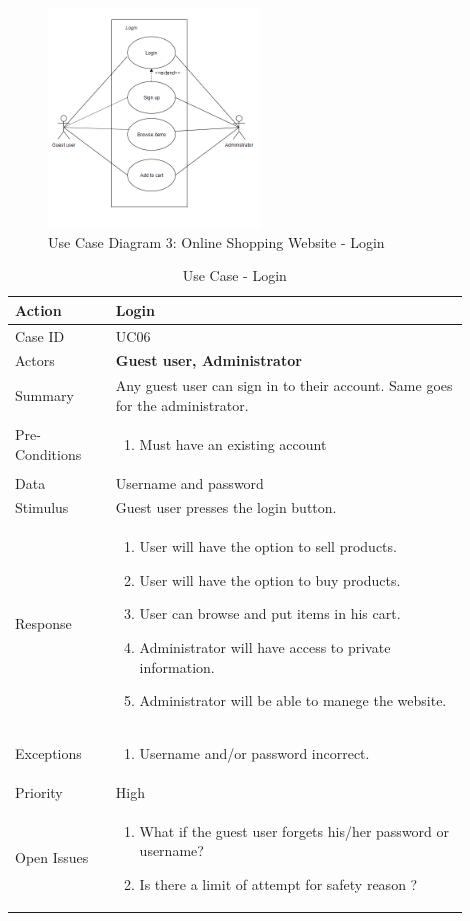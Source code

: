 \documentclass[11pt]{article}
\newcounter{use case ID}
\newcommand\tabularhead[1]{
    \begin{table}[ht]
        \addtocounter{use case ID}{1}
        \caption{Use Case \arabic{use case ID} - #1}
        \vspace{0.2cm}
        \begin{tabular}{|p{0.2\linewidth}|p{0.70\linewidth}|}
            \hline
            \textbf{Action} & \textbf{#1} \\
            \hline}
\newcommand\addrow[2]{#1 & #2\\ \hline}
\newcommand\addmulrow[2]{ \begin{minipage}[t][][t]{2.5cm}#1\end{minipage}
                &\begin{minipage}[t][][t]{11cm}
                    \begin{enumerate}[itemsep=-1ex] #2   \end{enumerate}
                \end{minipage}\vfill\\ \hline}
\newenvironment{usecase}{\tabularhead}
        {\hline\end{tabular}\end{table}}
\begin{document}
\begin{figure}[htbp]
    \centering
    \includegraphics[width=0.5\textwidth]{Diagrams/Use_Case/ucd3.png}
    \caption{Use Case Diagram 3: Online Shopping Website - Login }
    \label{fig:ucd3}
\end{figure}

\begin{usecase}{Login}
    \addrow{Case ID}{UC06}
    \addrow{Actors}{\textbf{Guest user, Administrator}}
    \addrow{Summary}{Any \index{guest user}guest user can sign in to their account. Same goes for the \index{administrator}administrator.}
    \addmulrow{Pre-Conditions}{
        \item Must have an existing account
    }
    \addrow{\index{data}Data}{Username and password}
    \addrow{Stimulus}{\index{guest user}Guest user presses the login button.}
    \addmulrow{Response}{
            \item User will have the option to sell \index{product}products.
            \item User will have the option to buy products.
            \item User can browse and put items in his cart.
            \item \index{administrator}Administrator will have access to private \index{information}information.
            \item Administrator will be able to manege the website.
    }
    \addmulrow{Exceptions}{
        \item Username and/or password incorrect.
    }
    \addrow{Priority}{High}
    \addmulrow{Open Issues}{
        \item What if the \index{guest user}guest user forgets his/her password or username?
        \item Is there a limit of attempt for safety reason ?
    }

\end{usecase}
\end{document}
